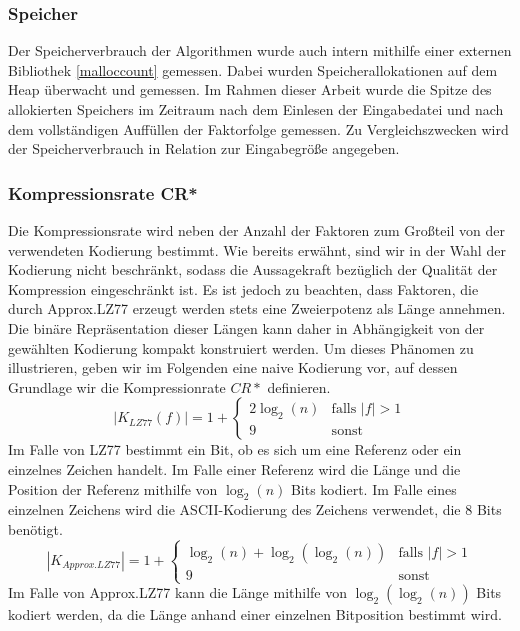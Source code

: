 \subsubsection{Speicher}
Der Speicherverbrauch der Algorithmen wurde auch intern mithilfe einer externen Bibliothek \ref{malloccount} gemessen. Dabei wurden Speicherallokationen auf dem Heap 
überwacht und gemessen. Im Rahmen dieser Arbeit wurde die Spitze des allokierten Speichers im Zeitraum nach dem Einlesen der Eingabedatei und nach dem vollständigen 
Auffüllen der Faktorfolge gemessen. Zu Vergleichszwecken wird der Speicherverbrauch in Relation zur Eingabegröße angegeben.

\subsubsection{Kompressionsrate CR*} \label{cr}
Die Kompressionsrate wird neben der Anzahl der Faktoren zum Großteil von der verwendeten Kodierung bestimmt. Wie bereits erwähnt, sind wir in der Wahl der Kodierung
nicht beschränkt, sodass die Aussagekraft bezüglich der Qualität der Kompression eingeschränkt ist. Es ist jedoch zu beachten, dass Faktoren, die durch Approx.LZ77
erzeugt werden stets eine Zweierpotenz als Länge annehmen. Die binäre Repräsentation dieser Längen kann daher in Abhängigkeit von der gewählten Kodierung kompakt 
konstruiert werden. Um dieses Phänomen zu illustrieren, geben wir im Folgenden eine naive Kodierung vor, auf dessen Grundlage wir die Kompressionrate $CR*$ definieren.
\begin{equation}
    |K_{LZ77}(f)| = 1 + \begin{cases}
        2\log_2(n) & \text{falls } |f| > 1 \\
        9 & \text{sonst}
    \end{cases}
\end{equation}
Im Falle von LZ77 bestimmt ein Bit, ob es sich um eine Referenz oder ein einzelnes Zeichen handelt. Im Falle einer Referenz wird die Länge und die Position der Referenz
mithilfe von $\log_2(n)$ Bits kodiert. Im Falle eines einzelnen Zeichens wird die ASCII-Kodierung des Zeichens verwendet, die 8 Bits benötigt.
\begin{equation}
    |K_{Approx.LZ77}|= 1 + \begin{cases}
        \log_2(n)+\log_2(\log_2(n)) & \text{falls } |f| > 1 \\
        9 & \text{sonst}
    \end{cases}
\end{equation}
Im Falle von Approx.LZ77 kann die Länge mithilfe von $\log_2(\log_2(n))$ Bits kodiert werden, da die Länge anhand einer einzelnen Bitposition bestimmt wird.

